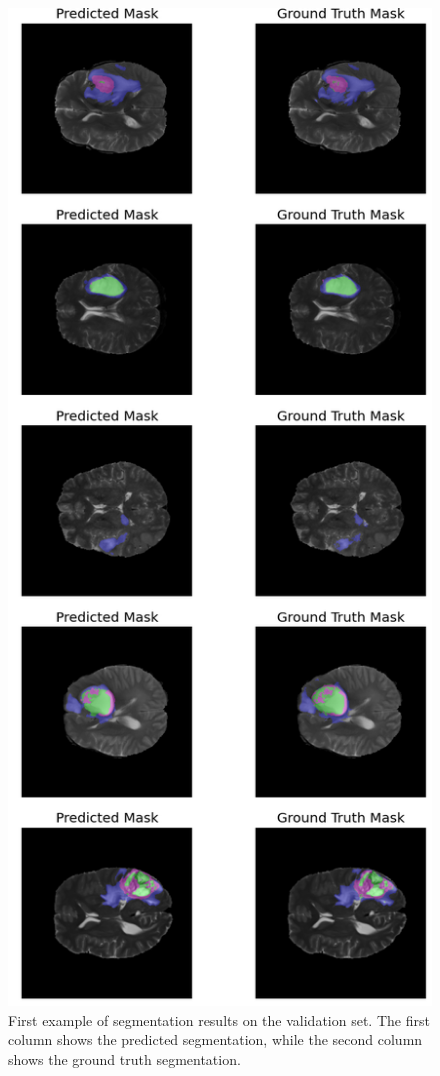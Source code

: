 \documentclass[10pt,twocolumn,letterpaper]{article}
\begin{document}
\begin{figure} 
\centering
\includegraphics[width=0.8\linewidth]{img/row-1-column-1.png}
\caption{First example of segmentation results on the validation set. The first column shows the predicted segmentation, while the second column shows the ground truth segmentation.}
\label{fig:row-1-column-1}
\end{figure}
\end{document}
